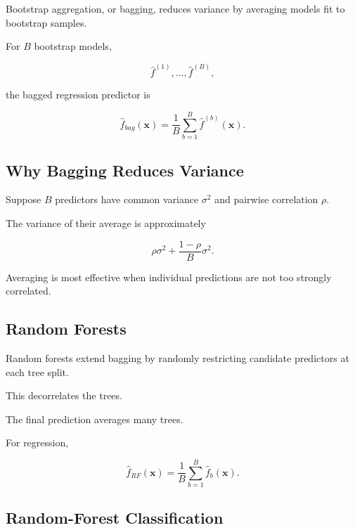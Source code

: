 Bootstrap aggregation, or bagging, reduces variance by averaging models
fit to bootstrap samples.

For \(B\) bootstrap models,

\[
\widehat{f}^{(1)},
\ldots,
\widehat{f}^{(B)},
\]

the bagged regression predictor is

\[
\boxed{
\widehat{f}_{bag}(\mathbf{x})
=
\frac1B
\sum_{b=1}^{B}
\widehat{f}^{(b)}(\mathbf{x}).
}
\]

\subsection{Why Bagging Reduces Variance}
\label{subsec:why-bagging-reduces-variance}

Suppose \(B\) predictors have common variance \(\sigma^2\) and pairwise
correlation \(\rho\).

The variance of their average is approximately

\[
\boxed{
\rho\sigma^2
+
\frac{
1-\rho
}{
B
}
\sigma^2.
}
\]

Averaging is most effective when individual predictions are not too
strongly correlated.

\subsection{Random Forests}
\label{subsec:random-forests}

Random forests extend bagging by randomly restricting candidate
predictors at each tree split.

This decorrelates the trees.

The final prediction averages many trees.

For regression,

\[
\boxed{
\widehat{f}_{RF}(\mathbf{x})
=
\frac1B
\sum_{b=1}^{B}
\widehat{f}_b(\mathbf{x}).
}
\]

\subsection{Random-Forest Classification}
\label{subsec:random-forest-classification}

